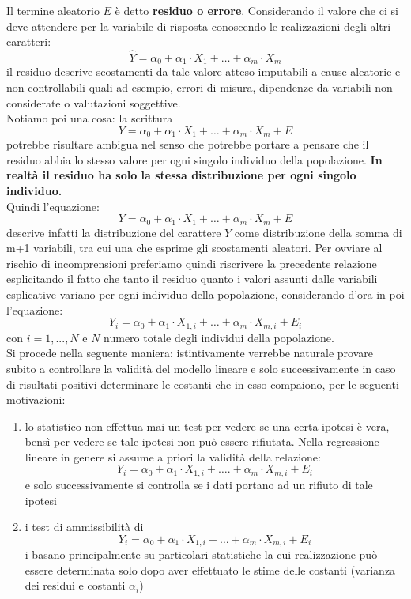 \documentclass[a4paper,12pt, oneside]{book}
\begin{document}
Il termine aleatorio $E$ è detto \textbf{residuo o errore}. Considerando il
valore che ci si deve attendere per la variabile di risposta conoscendo le
realizzazioni degli altri caratteri:
\[\hat{Y}=\alpha_{0}+\alpha_{1} \cdot X_{1}+\ldots+\alpha_{m} \cdot X_{m}\]
il residuo descrive scostamenti da tale valore atteso imputabili a cause aleatorie e
non controllabili quali ad esempio, errori di misura, dipendenze da variabili non
considerate o valutazioni soggettive.\\
Notiamo poi una cosa: la scrittura
\[Y=\alpha_{0}+\alpha_{1} \cdot X_{1}+\ldots+\alpha_{m} \cdot X_{m}+E\]
potrebbe risultare ambigua nel senso che potrebbe portare a pensare che il residuo
abbia lo stesso valore per ogni singolo individuo della popolazione.\textbf{ In realtà il
  residuo ha solo la stessa distribuzione per ogni singolo individuo.}\\
Quindi l'equazione:
\[Y=\alpha_{0}+\alpha_{1} \cdot X_{1}+\ldots+\alpha_{m} \cdot X_{m}+E\]
descrive infatti la distribuzione del carattere $Y$ come distribuzione della somma di
m+1 variabili, tra cui una che esprime gli scostamenti aleatori.
Per ovviare al rischio di incomprensioni preferiamo quindi riscrivere la precedente
relazione esplicitando il fatto che tanto il residuo quanto i valori assunti dalle variabili
esplicative variano per ogni individuo della popolazione, considerando d’ora in poi
l’equazione:
\[Y_{i}=\alpha_{0}+\alpha_{1} \cdot X_{1, i}+\ldots+\alpha_{m} \cdot X_{m, i}+E_{i}\]
con $i=1,...,N$ e $N$ numero totale degli individui della popolazione.\\
Si procede nella seguente maniera: istintivamente verrebbe naturale provare subito a controllare la validità
del modello lineare e solo successivamente in caso di risultati positivi determinare le
costanti che in esso compaiono, per le seguenti motivazioni:
\begin{enumerate}
\item lo statistico non effettua mai un test per vedere se
una certa ipotesi è vera, bensì per vedere se tale ipotesi non può essere rifiutata.
Nella regressione lineare in genere si assume a priori la validità della relazione:
\[Y_{i}=\alpha_{0}+\alpha_{1} \cdot X_{1, i}+\ldots .+\alpha_{m} \cdot X_{m, i}+E_{i}\]
e solo successivamente si controlla se i dati portano ad un rifiuto di tale ipotesi
\item i test di ammissibilità di
  \[Y_{i}=\alpha_{0}+\alpha_{1} \cdot X_{1, i}+\ldots+\alpha_{m} \cdot X_{m, i}+E_{i}\]
  i basano principalmente su particolari statistiche la cui realizzazione può essere
determinata solo dopo aver effettuato le stime delle costanti (varianza dei residui e
costanti $\alpha_i$)
\end{enumerate}
\end{document}
